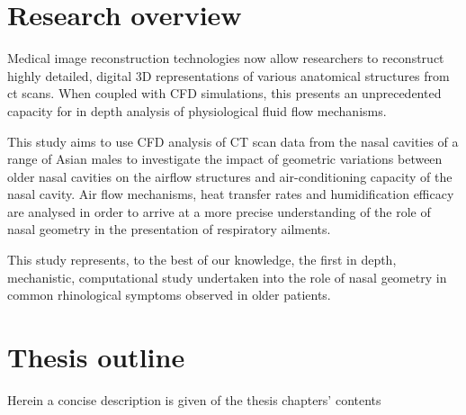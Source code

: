 \section{Research overview}

Medical image reconstruction technologies now allow researchers to reconstruct highly detailed, digital 3D representations of various anatomical structures from ct scans. When coupled with CFD simulations, this presents an unprecedented capacity for in depth analysis of physiological fluid flow mechanisms.

This study aims to use CFD analysis of CT scan data from the nasal cavities of a range of Asian males to investigate the impact of geometric variations between older nasal cavities on the airflow structures and air-conditioning capacity of the nasal cavity. Air flow mechanisms, heat transfer rates and humidification efficacy are analysed in order to arrive at a more precise understanding of the role of nasal geometry in the presentation of respiratory ailments.

This study represents, to the best of our knowledge, the first in depth, mechanistic, computational study undertaken into the role of nasal geometry in common rhinological symptoms observed in older patients.

\section{Thesis outline}

Herein a concise description is given of the thesis chapters' contents

